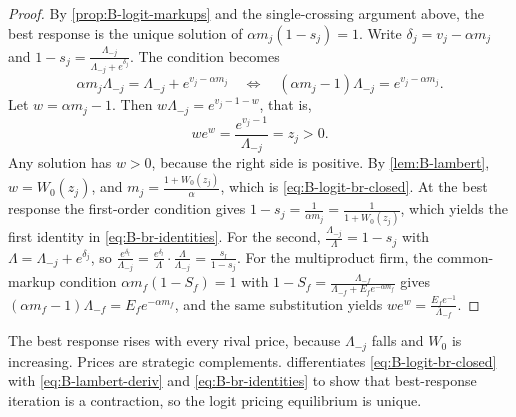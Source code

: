 \begin{proof}
By \cref{prop:B-logit-markups} and the single-crossing argument above, the best response is the unique
solution of $\alpha m_j(1 - s_j) = 1$. Write $\delta_j = v_j - \alpha m_j$ and
$1 - s_j = \frac{\Lambda_{-j}}{\Lambda_{-j} + e^{\delta_j}}$. The condition becomes
\begin{equation*}
\alpha m_j\Lambda_{-j} = \Lambda_{-j} + e^{v_j - \alpha m_j}
\quad\Longleftrightarrow\quad
(\alpha m_j - 1)\Lambda_{-j} = e^{v_j - \alpha m_j} .
\end{equation*}
Let $w = \alpha m_j - 1$. Then $w\Lambda_{-j} = e^{v_j - 1 - w}$, that is,
\begin{equation*}
we^w = \frac{e^{v_j - 1}}{\Lambda_{-j}} = z_j > 0 .
\end{equation*}
Any solution has $w > 0$, because the right side is positive. By \cref{lem:B-lambert}, $w = W_0(z_j)$, and
$m_j = \frac{1 + W_0(z_j)}{\alpha}$, which is \eqref{eq:B-logit-br-closed}. At the best response the first-order condition
gives $1 - s_j = \frac{1}{\alpha m_j} = \frac{1}{1 + W_0(z_j)}$, which yields the first identity in
\eqref{eq:B-br-identities}. For the second, $\frac{\Lambda_{-j}}{\Lambda} = 1 - s_j$ with $\Lambda = \Lambda_{-j} + e^{\delta_j}$, so
$\frac{e^{\delta_l}}{\Lambda_{-j}} = \frac{e^{\delta_l}}{\Lambda}\cdot\frac{\Lambda}{\Lambda_{-j}} = \frac{s_l}{1 - s_j}$. For the multiproduct
firm, the common-markup condition $\alpha m_f(1 - S_f) = 1$ with
$1 - S_f = \frac{\Lambda_{-f}}{\Lambda_{-f} + E_fe^{-\alpha m_f}}$ gives $(\alpha m_f - 1)\Lambda_{-f} = E_fe^{-\alpha m_f}$, and the same
substitution yields $we^w = \frac{E_fe^{-1}}{\Lambda_{-f}}$.
\end{proof}

The best response rises with every rival price, because $\Lambda_{-j}$ falls and $W_0$ is increasing. Prices are
strategic complements.  differentiates \eqref{eq:B-logit-br-closed} with
\eqref{eq:B-lambert-deriv} and \eqref{eq:B-br-identities} to show that best-response iteration is a contraction, so
the logit pricing equilibrium is unique.

